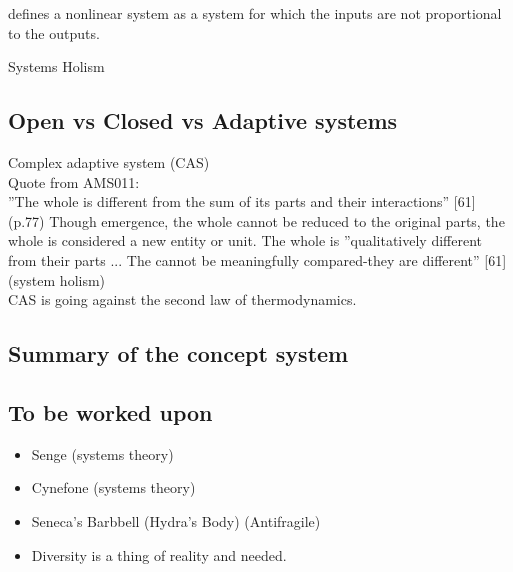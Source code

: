 \textcite[p. 934]{Rickles2007} defines a nonlinear system as a system for which the inputs are not proportional to the outputs.

Systems Holism

\subsection{Open vs Closed vs Adaptive systems}
\label{sub:tbopenclosedadaptivesystems}
Complex adaptive system (CAS)\\

Quote from AMS011: \parencite{Turner2019}\\
''The whole is different from the sum of its parts and their interactions'' [61] (p.77) Though emergence, the whole cannot be reduced to the original parts, the whole is considered a new entity or unit. The whole is ''qualitatively different from their parts ... The cannot be meaningfully compared-they are different'' [61] (system holism)\\
CAS is going against the second law of thermodynamics.\\

\textcite[p. 32]{Bertalanffy1968}

\subsection{Summary of the concept system}
\label{sub:tbsummarysystem}


\subsection{To be worked upon}

\begin{itemize}
	\item{Senge (systems theory)}
	\item{Cynefone (systems theory)}
	\item{Seneca's Barbbell (Hydra's Body) (Antifragile)}
	\item{Diversity is a thing of reality and needed.}
\end{itemize}
